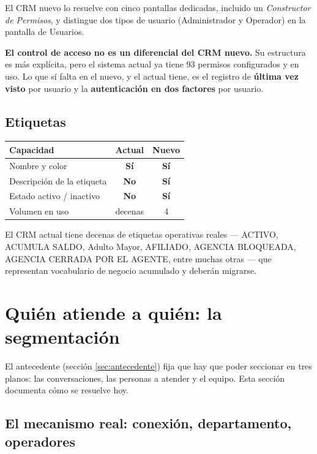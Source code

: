 \documentclass[11pt,a4paper]{article}
\newcommand{\si}{\textcolor{ok}{\textbf{Sí}}}
\newcommand{\no}{\textcolor{warn}{\textbf{No}}}
\begin{document}
El CRM nuevo lo resuelve con cinco pantallas dedicadas, incluido un \emph{Constructor
de Permisos}, y distingue dos tipos de usuario (Administrador y Operador) en la pantalla
de Usuarios.

\begin{nota}
\textbf{El control de acceso no es un diferencial del CRM nuevo.} Su estructura es más
explícita, pero el sistema actual ya tiene 93 permisos configurados y en uso. Lo que sí
falta en el nuevo, y el actual tiene, es el registro de \textbf{última vez visto} por
usuario y la \textbf{autenticación en dos factores} por usuario.
\end{nota}

\subsection{Etiquetas}

\begin{center}
\begin{tabularx}{\textwidth}{@{}Lcc@{}}
\toprule
\textbf{Capacidad} & \textbf{Actual} & \textbf{Nuevo} \\
\midrule
Nombre y color                & \si & \si \\
Descripción de la etiqueta    & \no & \si \\
Estado activo / inactivo      & \no & \si \\
Volumen en uso                & decenas & 4 \\
\bottomrule
\end{tabularx}
\end{center}

El CRM actual tiene decenas de etiquetas operativas reales --- ACTIVO, ACUMULA SALDO,
Adulto Mayor, AFILIADO, AGENCIA BLOQUEADA, AGENCIA CERRADA POR EL AGENTE, entre muchas
otras --- que representan vocabulario de negocio acumulado y deberán migrarse.

\section{Quién atiende a quién: la segmentación}
\label{sec:visibilidad}

El antecedente (sección \ref{sec:antecedente}) fija que hay que poder seccionar en tres
planos: las conversaciones, las personas a atender y el equipo. Esta sección documenta
cómo se resuelve hoy.

\subsection{El mecanismo real: conexión, departamento, operadores}
\end{document}
